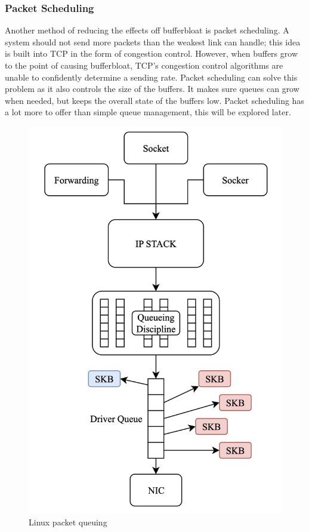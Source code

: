 \documentclass[a4paper,english, 11pt]{report}
\begin{document}
\subsubsection{Packet Scheduling}
Another method of reducing the effects off bufferbloat is packet scheduling. A system should not send more packets than the weakest link can handle; this idea is built into TCP in the form of congestion control. However, when buffers grow to the point of causing bufferbloat, TCP's congestion control algorithms are unable to confidently determine a sending rate. Packet scheduling can solve this problem as it also controls the size of the buffers. It makes sure queues can grow when needed, but keeps the overall state of the buffers low. Packet scheduling has a lot more to offer than simple queue management, this will be explored later.\\


\begin{figure}[!h] %
	\centering
	\includegraphics[scale=0.30]{../diagrams/drawio/queueing.png}
  	\caption{Linux packet queuing}
  	\label{fig:blockage}
\end{figure}
\end{document}
